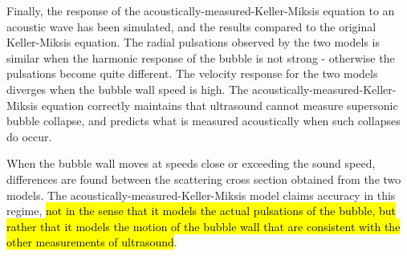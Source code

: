 


Finally, the response of the acoustically-measured-Keller-Miksis equation to an acoustic wave has been simulated,
and the results compared to the original Keller-Miksis equation.
The radial pulsations observed by the two models is similar when the harmonic response of the bubble is not strong -
otherwise the pulsations become quite different.
The velocity response for the two models diverges when the bubble wall speed is high.
The acoustically-measured-Keller-Miksis equation correctly maintains
that ultrasound cannot measure supersonic bubble collapse, 
and predicts what is measured acoustically when such collapses do occur.

When the bubble wall moves at speeds close or exceeding the sound speed,
differences are found between the scattering cross section obtained from the two models.
The acoustically-measured-Keller-Miksis model claims accuracy in this regime,
\hl{not in the sense that it models the actual pulsations of the bubble,
but rather that it models the motion of the bubble wall that are consistent with the other measurements of ultrasound}.




